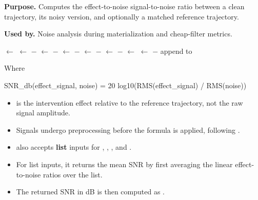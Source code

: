 \documentclass[11pt]{article}
\begin{document}
\begin{algorithm}[H]
\caption{}
\label{def:quantify-noise-utility}
\textbf{Purpose.} Computes the effect-to-noise signal-to-noise ratio between a clean trajectory, its noisy version, and optionally a matched reference trajectory.

\textbf{Used by.} Noise analysis during materialization and cheap-filter metrics.
\par\smallskip
\begin{algorithmic}[1]
\State {} $\gets$ \code{[]}
        \State {} $\gets$  $-$ 
            \State {} $\gets$  $-$ 
            \State {} $\gets$  $-$ 
            \State {} $\gets$  $-$ 
        \Else
            \State {} $\gets$  $-$ 
        \EndIf
    \Else
        \State {} $\gets$ 
        \State {} $\gets$  $-$ 
    \EndIf
    \State append  to 
\EndFor
\State \Return {}
\end{algorithmic}
\end{algorithm}

Where 
\begin{DocCode}
    SNR_db(effect_signal, noise) = 20 log10(RMS(effect_signal) / RMS(noise))
\end{DocCode}
\begin{itemize}
    \item {} is the intervention effect relative to the reference trajectory, not the raw signal amplitude.
    \item Signals undergo preprocessing before the formula is applied, following .
    \item {} also accepts \textbf{list} inputs for , , , and .
    \item For list inputs, it returns the mean SNR by first averaging the linear effect-to-noise ratios over the list.
    \item The returned SNR in dB is then computed as .
    \end{itemize}
\end{document}
